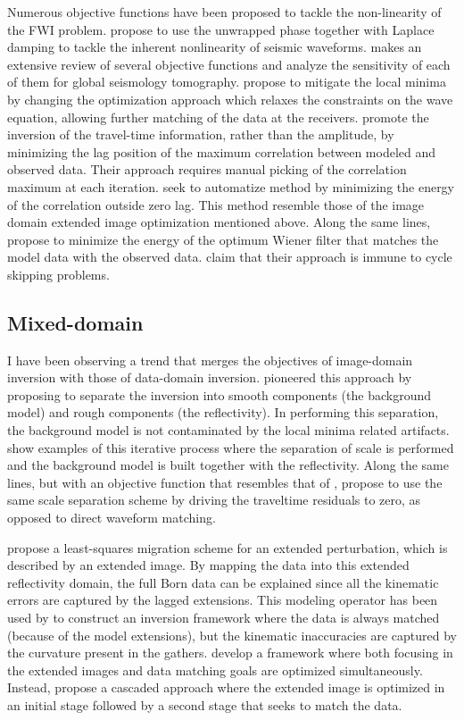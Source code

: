 Numerous objective functions have been proposed to tackle the non-linearity of the
FWI problem. \cite{TariqChoi,ChoiTariq} propose to use the unwrapped phase together with 
Laplace damping to tackle the inherent nonlinearity of seismic waveforms. \cite{GJI:GJI4970} makes
an extensive review of several objective functions and analyze the sensitivity of each of them
for global seismology tomography. \cite{van2013mitigating} propose to mitigate the local
minima by changing the optimization
approach which relaxes the constraints on the wave equation, allowing further matching of the data
at the receivers. \cite{Luo91} promote the inversion of the travel-time information, rather
than the amplitude, by minimizing the lag position of the maximum correlation between
modeled and observed data. Their approach requires manual picking of the correlation maximum
at each iteration. \cite{van2010correlation} seek to automatize \citep{Luo91} method
by minimizing the energy of the correlation outside zero lag. This method resemble those 
of the image domain extended image optimization mentioned above. Along the same lines, 
\cite{simon,warner} propose to minimize the energy of the optimum Wiener filter that
matches the model data with the observed data. \cite{warner} claim that their approach is 
immune to cycle skipping problems. 

\subsection{Mixed-domain}

I have been observing a trend that merges the objectives
of image-domain inversion  with those of data-domain inversion. \cite{clement} 
 pioneered  this approach by proposing to separate the inversion into smooth 
components (the background model) and rough components (the reflectivity). In performing
this separation, the background model is not contaminated by the local minima related artifacts. 
 \cite{Xu,HWang,Zhou01092015,Zedong} show examples of this iterative process where 
the separation of scale is performed and the background model is built together with the
reflectivity. Along the same lines, but with an objective function that resembles that of \cite{Luo91},
 \cite{MaWarping} propose to use the same scale separation scheme by driving 
the traveltime residuals to zero, as opposed to direct waveform matching. 
 
\cite{GPR:GPR698} propose a least-squares migration scheme for an extended perturbation, which
 is described by an extended image. By mapping the data into this extended reflectivity domain, 
 the full Born data can be explained since all the kinematic errors are captured by the lagged
extensions. This modeling operator has been used by \citep{BiondiAli:2014} to construct
an inversion framework where the data is always matched (because of the model extensions), 
 but the kinematic inaccuracies are captured by the curvature present in the gathers. 
 \cite{FleuryPerrone} develop a framework where both focusing in the  extended images and data matching 
goals are optimized simultaneously. Instead, \cite{diaz2013data} propose a cascaded 
approach where the extended image is optimized in an initial stage followed by a second stage 
that seeks to match the data.

